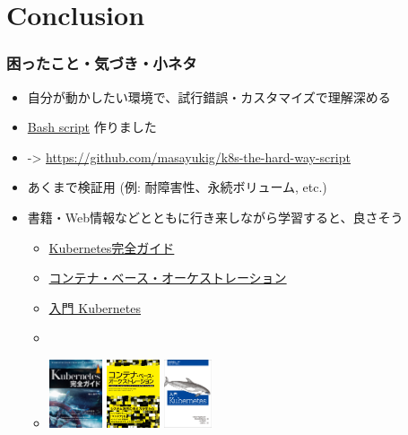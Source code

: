 \documentclass[aspectratio=169,11pt,hyperref={colorlinks=true}]{beamer}
\begin{document}
\section{Conclusion}
\begin{frame}
  \frametitle{困ったこと・気づき・小ネタ}
  \begin{itemize}
    \item 自分が動かしたい環境で、試行錯誤・カスタマイズで理解深める
    \item \href{https://github.com/masayukig/k8s-the-hard-way-script}{Bash script} 作りました
    \item[] -> \url{https://github.com/masayukig/k8s-the-hard-way-script}
    \item あくまで検証用 (例: 耐障害性、永続ボリューム, etc.)
    \item 書籍・Web情報などとともに行き来しながら学習すると、良さそう
    \begin{itemize}
      \item
      \href{https://book.impress.co.jp/books/1118101055}{Kubernetes完全ガイド}
      \item
      \href{https://www.shoeisha.co.jp/book/detail/9784798155371}{コンテナ・ベース・オーケストレーション}
      \item
      \href{https://www.oreilly.co.jp/books/9784873118406/}{入門 Kubernetes}
      \item[]
      \item[] \includegraphics[height=20mm]{images/kubernetes_complete_guide.jpg}
       \includegraphics[height=20mm]{images/container_based_orchestration.jpg}
       \includegraphics[height=20mm]{images/kubernetes_up_and_running.jpeg}
    \end{itemize}
  \end{itemize}
\end{frame}
\end{document}

